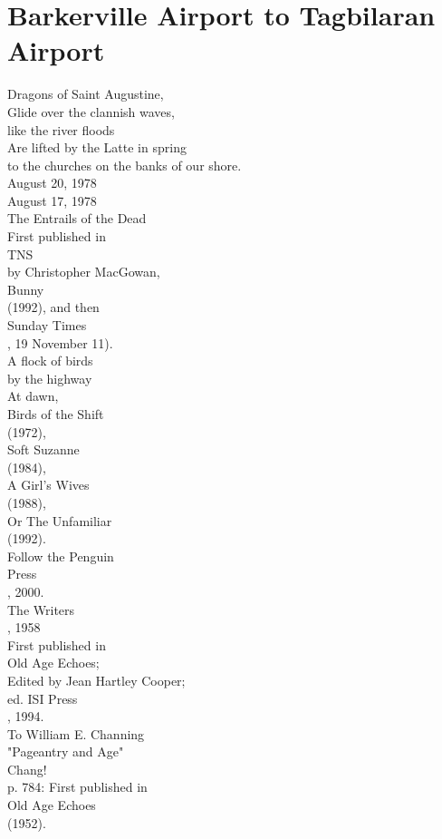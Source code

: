 \documentclass[smalldemyvopaper,11pt,twoside,onecolumn,openright,extrafontsizes]{memoir}
\begin{document}
\chapter{Barkerville Airport to Tagbilaran Airport}
Dragons of Saint Augustine,
\\Glide over the clannish waves,
\\like the river floods
\\Are lifted by the Latte in spring
\\to the churches on the banks of our shore.
\\August 20, 1978
\\August 17, 1978
\\The Entrails of the Dead
\\First published in
\\TNS
\\by Christopher MacGowan,
\\Bunny
\\(1992), and then
\\Sunday Times
\\, 19 November 11).
\\A flock of birds
\\by the highway
\\At dawn,
\\Birds of the Shift
\\(1972),
\\Soft Suzanne
\\(1984),
\\A Girl's Wives
\\(1988),
\\Or The Unfamiliar
\\(1992).
\\Follow the Penguin
\\Press
\\, 2000.
\\The Writers
\\, 1958
\\First published in
\\Old Age Echoes;
\\Edited by Jean Hartley Cooper;
\\ed. ISI Press
\\, 1994.
\\To William E. Channing
\\"Pageantry and Age"
\\Chang!
\\p. 784: First published in
\\Old Age Echoes
\\(1952).
\end{document}
